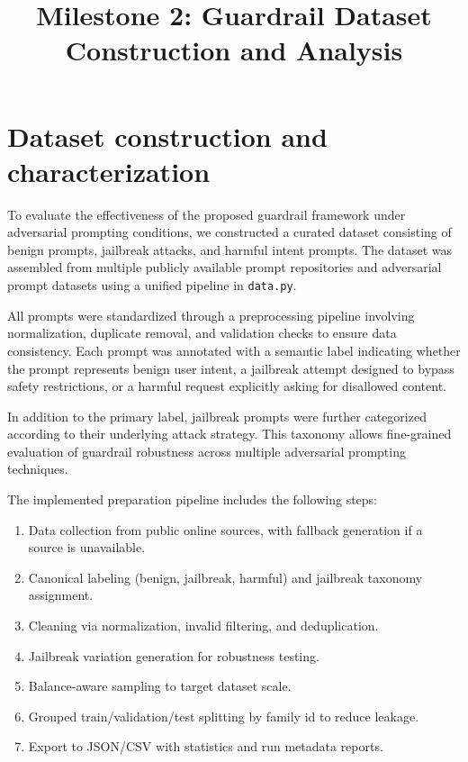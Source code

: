 \documentclass[11pt]{article}
\begin{document}
\title{\textbf{Milestone 2: Guardrail Dataset Construction and Analysis}}
\date{}
\maketitle

\onehalfspacing


\section{Dataset construction and characterization}

To evaluate the effectiveness of the proposed guardrail framework under adversarial prompting conditions, we constructed a curated dataset consisting of benign prompts, jailbreak attacks, and harmful intent prompts. The dataset was assembled from multiple publicly available prompt repositories and adversarial prompt datasets using a unified pipeline in \texttt{data.py}.

All prompts were standardized through a preprocessing pipeline involving normalization, duplicate removal, and validation checks to ensure data consistency. Each prompt was annotated with a semantic label indicating whether the prompt represents benign user intent, a jailbreak attempt designed to bypass safety restrictions, or a harmful request explicitly asking for disallowed content.

In addition to the primary label, jailbreak prompts were further categorized according to their underlying attack strategy. This taxonomy allows fine-grained evaluation of guardrail robustness across multiple adversarial prompting techniques.

The implemented preparation pipeline includes the following steps:
\begin{enumerate}[leftmargin=*]
\item Data collection from public online sources, with fallback generation if a source is unavailable.
\item Canonical labeling (benign, jailbreak, harmful) and jailbreak taxonomy assignment.
\item Cleaning via normalization, invalid filtering, and deduplication.
\item Jailbreak variation generation for robustness testing.
\item Balance-aware sampling to target dataset scale.
\item Grouped train/validation/test splitting by family id to reduce leakage.
\item Export to JSON/CSV with statistics and run metadata reports.
\end{enumerate}
\end{document}
